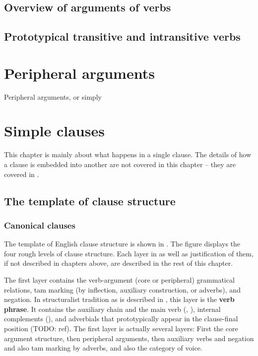 \documentclass[UTF8, a4paper, oneside, scheme=plain]{ctexrep}
\newcommand*{\concept}[1]{\textbf{#1}}
\begin{document}
\section{Overview of arguments of verbs}\label{sec:valency.overview}

\section{Prototypical transitive and intransitive verbs}



\chapter{Peripheral arguments}\label{chap:peripheral-arguments}

Peripheral arguments, or simply 

\chapter{Simple clauses}\label{chap:simple-clause}

This chapter is mainly about what happens in a single clause.
The details of how a clause is embedded into another are not covered in this chapter
-- they are covered in .

\section{The template of clause structure}\label{sec:clause-template}

\subsection{Canonical clauses}

The template of English clause structure is shown in .
The figure displays the four rough levels of clause structure.
Each layer in  as well as justification of them,
if not described in chapters above, are described 
in the rest of this chapter.

The first layer contains the verb-argument (core or peripheral) grammatical relations,
\ac{tam} marking (by inflection, auxiliary construction, or adverbs), and negation.
In structuralist tradition as is described in \citet{cgel},
this layer is the \concept{verb phrase}.
It contains the auxiliary chain and the main verb 
(, ),
internal complements (),
and adverbials that prototypically appear in the clause-final position (TODO: ref).
The first layer is actually several layers:
First the core argument structure,
then peripheral arguments, 
then auxiliary verbs and negation and also \acs{tam} marking by adverbs,
and also the category of voice. 
\end{document}
